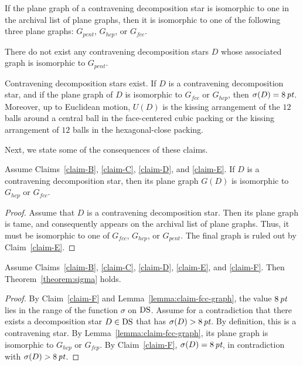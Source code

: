 \begin{claim}\label{claim-D}
If the plane graph of a contravening
decomposition star is isomorphic to one in the archival list of
plane graphs, then it is isomorphic to one of the following three
plane graphs: $G_{pent}$, $G_{hcp}$, or $G_{fcc}$.
\end{claim} %

\begin{claim}\label{claim-E}
There do not exist any contravening decomposition stars
$D$ whose associated graph is isomorphic to $G_{pent}$.
\end{claim} %

\begin{claim}\label{claim-F}
Contravening decomposition stars exist.
If $D$ is a contravening
decomposition star, and if the plane graph of $D$ is isomorphic to
$G_{fcc}$ or $G_{hcp}$, then $\sigma(D) = 8\,\hbox{\it pt}$.  Moreover, up
to Euclidean motion, $U(D)$ is the kissing arrangement of the $12$
balls around a central ball in the face-centered cubic packing or
the kissing arrangement of $12$ balls in the hexagonal-close
packing.
\end{claim} %

Next, we state some of the consequences of these claims.

\begin{lemma}\label{lemma:claim-fcc-graph}
Assume Claims~\ref{claim-B}, \ref{claim-C}, \ref{claim-D}, and
\ref{claim-E}. If $D$ is a contravening decomposition star, then
its plane graph $G(D)$ is isomorphic to $G_{hcp}$ or $G_{fcc}$.
\end{lemma}

\begin{proof} Assume that $D$ is a contravening decomposition
star.  Then its plane graph is tame, and consequently appears on
the archival list of plane graphs.  Thus, it must be isomorphic to
one of $G_{fcc}$, $G_{hcp}$, or $G_{pent}$.  The final graph is
ruled out by Claim~\ref{claim-E}.
\end{proof}

\begin{lemma}\label{lemma:claim-sigma}
Assume Claims~\ref{claim-B}, \ref{claim-C}, \ref{claim-D},
\ref{claim-E}, and \ref{claim-F}. Then Theorem~\ref{theorem:sigma}
holds.
\end{lemma}

\begin{proof}
By Claim~\ref{claim-F} and Lemma~\ref{lemma:claim-fcc-graph}, the
value $8\,\hbox{\it pt}$ lies in the range of the function $\sigma$ on
${\operatorname{DS}}$.   Assume for a contradiction that there exists a
decomposition star $D\in {\operatorname{DS}}$ that has $\sigma(D)>8\,\hbox{\it pt}$. By
definition, this is a contravening star. By
Lemma~\ref{lemma:claim-fcc-graph}, its plane graph is isomorphic
to $G_{hcp}$ or $G_{fcp}$.  By Claim~\ref{claim-F},
$\sigma(D)=8\,\hbox{\it pt}$, in contradiction with $\sigma(D)>8\,\hbox{\it pt}$.
\end{proof}

